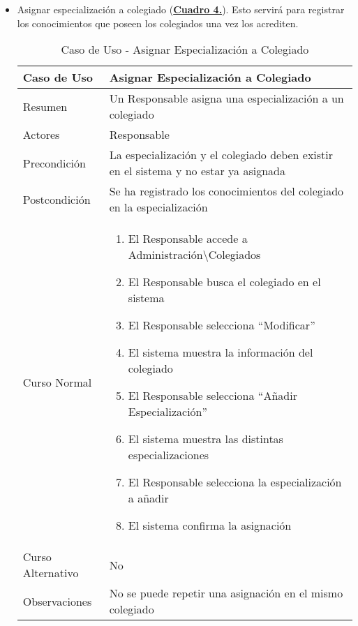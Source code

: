 \begin{itemize}
  \pagebreak
	\item \addtocounter{tabla}{1} Asignar especialización a colegiado (\textbf{\hyperref[tab:curAsignarEspecColeg]{Cuadro 4.}}). Esto servirá para registrar los conocimientos que poseen los colegiados una vez los acrediten.
		\begin{table}[!htbp]
		  \centering  \addtocounter{casouso}{1}
		  \begin{tabular}{|l | p{100mm}|}
		    \textbf{Caso de Uso}  & \textbf{Asignar Especialización a Colegiado} \\ \hline
		    Resumen 		 & Un Responsable asigna una especialización a un colegiado \\ \hline
		    Actores  		 & Responsable \\ \hline
		    Precondición  	 & La especialización y el colegiado deben existir en el sistema y no estar ya asignada  \\ \hline
		    Postcondición  	 & Se ha registrado los conocimientos del colegiado en la especialización \\ \hline
		    Curso Normal   	 & \begin{enumerate}
			  \item El Responsable accede a Administración\textbackslash Colegiados
			  \item El Responsable busca el colegiado en el sistema
			  \item El Responsable selecciona ``Modificar''
			  \item El sistema muestra la información del colegiado
			  \item El Responsable selecciona ``Añadir Especialización''
			  \item El sistema muestra las distintas especializaciones
			  \item El Responsable selecciona la especialización a añadir
			  \item El sistema confirma la asignación
		    \end{enumerate}  \\ \hline
		    Curso Alternativo  & No  \\ \hline
		    Observaciones 	 & No se puede repetir una asignación en el mismo colegiado  \\ \hline
		  \end{tabular}
		  \caption{Caso de Uso  - Asignar Especialización a Colegiado}
		  \label{tab:curAsignarEspecColeg}
		\end{table}
		\FloatBarrier
	

\end{itemize}
